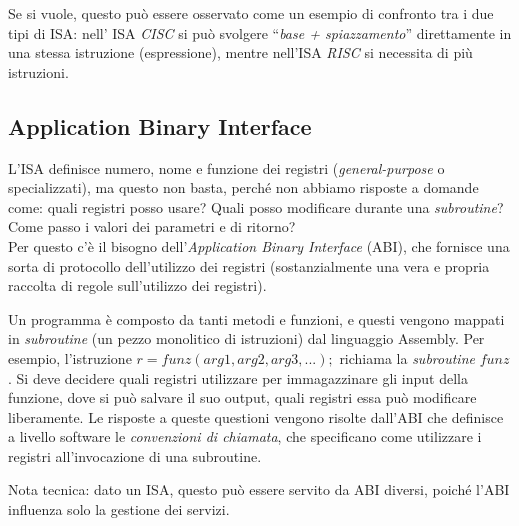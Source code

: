 \documentclass[class=book, crop=false]{standalone}
\begin{document}
Se si vuole, questo può essere osservato come un esempio di confronto tra i due tipi di ISA: nell’ ISA \emph{CISC} si può svolgere “\emph{base + spiazzamento}” direttamente in una stessa istruzione (espressione), mentre nell'ISA \emph{RISC} si necessita di più istruzioni.

\subsection{Application Binary Interface}
L'ISA definisce numero, nome e funzione dei registri (\emph{general-purpose} o  specializzati), ma questo non basta, perché non abbiamo risposte a domande come: quali registri posso usare? Quali posso modificare durante una \emph{subroutine}? Come passo i valori dei parametri e di ritorno?\\
Per questo c’è il bisogno dell'\emph{Application Binary Interface} (ABI), che fornisce una sorta di protocollo dell’utilizzo dei registri (sostanzialmente una vera e propria raccolta di regole sull’utilizzo dei registri).

Un programma è composto da tanti metodi e funzioni, e questi vengono mappati in \emph{subroutine} (un pezzo monolitico di istruzioni) dal linguaggio Assembly. Per esempio, l’istruzione $r=funz(arg1, arg2, arg3, ...);$ richiama la \emph{subroutine} \(funz\). Si deve decidere quali registri utilizzare per immagazzinare gli input della funzione, dove si può salvare il suo output, quali registri essa può modificare liberamente. Le risposte a queste questioni vengono risolte dall’ABI che definisce a livello software le \emph{convenzioni di chiamata}, che specificano come utilizzare i registri all’invocazione di una subroutine.

Nota tecnica: dato un ISA, questo può essere servito da ABI diversi, poiché l’ABI influenza solo la gestione dei servizi.
\end{document}
